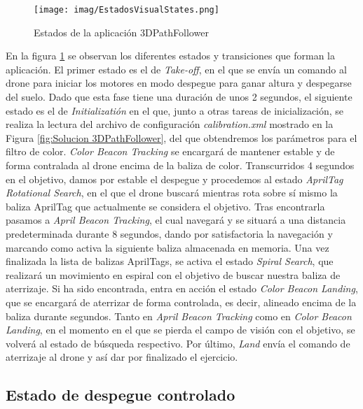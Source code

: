 \begin{figure}[H]
	\begin{center}
		\texttt{[image: imag/EstadosVisualStates.png]}
		\caption{Estados de la aplicación 3DPathFollower}
		\label{fig: EstadosVisualStates.}	
	\end{center}
\end{figure}

En la figura \ref{fig: EstadosVisualStates.} se observan los diferentes estados y transiciones que forman la aplicación. El primer estado es el de \textit{Take-off}, en el que se envía un comando al drone para iniciar los motores en modo despegue para ganar altura y despegarse del suelo. Dado que esta fase tiene una duración de unos 2 segundos, el siguiente estado es el de \textit{Initializatión} en el que, junto a otras tareas de inicialización, se realiza la lectura del archivo de configuración \textit{calibration.xml} mostrado en la Figura \ref{fig:Solucion 3DPathFollower}, del que obtendremos los parámetros para el filtro de color. \textit{Color Beacon Tracking} se encargará de mantener estable y de forma contralada al drone encima de la baliza de color. Transcurridos 4 segundos en el objetivo, damos por estable el despegue y procedemos al estado \textit{AprilTag Rotational Search}, en el que el drone buscará mientras rota sobre sí mismo la baliza AprilTag que actualmente se considera el objetivo. Tras encontrarla pasamos a \textit{April Beacon Tracking}, el cual navegará y se situará a una distancia predeterminada durante 8 segundos, dando por satisfactoria la navegación y marcando como activa la siguiente baliza almacenada en memoria. Una vez finalizada la lista de balizas AprilTags, se activa el estado \textit{Spiral Search}, que realizará un movimiento en espiral con el objetivo de buscar nuestra baliza de aterrizaje. Si ha sido encontrada, entra en acción el estado \textit{Color Beacon Landing}, que se encargará de aterrizar de forma controlada, es decir, alineado encima de la baliza durante segundos. Tanto en \textit{April Beacon Tracking} como en  \textit{Color Beacon Landing}, en el momento en el que se pierda el campo de visión con el objetivo, se volverá al estado de búsqueda respectivo. Por último, \textit{Land} envía el comando de aterrizaje al drone y así dar por finalizado el ejercicio.



\subsection{Estado de despegue controlado}
\label{subsec:algoritmo despegue}

